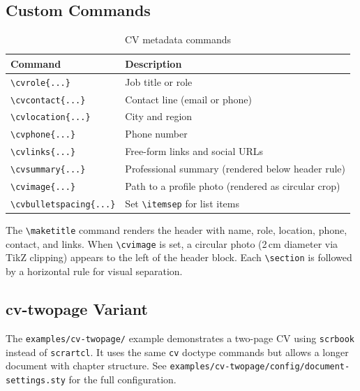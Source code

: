 \subsection{Custom Commands}

\begin{table}[htbp]
    \centering
    \caption{CV metadata commands}
    \label{tab:cv-commands}
    \begin{tabular}{@{} l p{7.5cm} @{}}
        \toprule
        \textbf{Command} & \textbf{Description} \\
        \midrule
        \texttt{\textbackslash cvrole\{...\}}        & Job title or role \\
        \texttt{\textbackslash cvcontact\{...\}}     & Contact line (email or phone) \\
        \texttt{\textbackslash cvlocation\{...\}}    & City and region \\
        \texttt{\textbackslash cvphone\{...\}}       & Phone number \\
        \texttt{\textbackslash cvlinks\{...\}}       & Free-form links and social URLs \\
        \texttt{\textbackslash cvsummary\{...\}}     & Professional summary (rendered below header rule) \\
        \texttt{\textbackslash cvimage\{...\}}       & Path to a profile photo (rendered as circular crop) \\
        \texttt{\textbackslash cvbulletspacing\{...\}} & Set \texttt{\textbackslash itemsep} for list items \\
        \bottomrule
    \end{tabular}
\end{table}

The \texttt{\textbackslash maketitle} command renders the header with name,
role, location, phone, contact, and links.  When \texttt{\textbackslash cvimage}
is set, a circular photo (2\,cm diameter via TikZ clipping) appears to the
left of the header block.  Each \texttt{\textbackslash section} is followed
by a horizontal rule for visual separation.

\subsection{cv-twopage Variant}

The \texttt{examples/cv-twopage/} example demonstrates a two-page CV using
\texttt{scrbook} instead of \texttt{scrartcl}.  It uses the same
\texttt{cv} doctype commands but allows a longer document with chapter
structure.  See \texttt{examples/cv-twopage/config/document-settings.sty}
for the full configuration.

